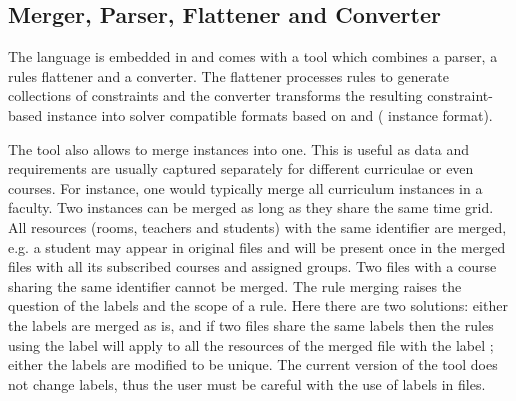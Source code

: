 
\subsection{Merger, Parser, Flattener and Converter}
The \UTP{} language is embedded in \XML{}
and comes with a \PHP{} tool 
which combines a parser, a rules flattener and a converter.
The flattener processes rules to generate collections of {\UTP} constraints
and the converter transforms the resulting constraint-based instance into 
\CP{} solver compatible formats based on \JSON{} and \DZN{} (\MINIZINC{} instance format).

The tool also allows to merge \UTP{} instances
into one.
This is useful as data and requirements are usually captured separately for different curriculae or even courses. %
For instance, one would typically merge all curriculum instances in a faculty. %
%
Two \UTP{} instances can be merged as long as they share the same time grid.
All resources (rooms, teachers and students) with the same identifier are merged, e.g. a student may appear in original files and will be present once in the merged files with all its subscribed courses and assigned groups.
Two files with a course sharing the same identifier cannot be merged.
The rule merging raises the question of the labels and the scope of a rule.
Here there are two solutions: either the labels are merged as is, and if two files share the same labels then the rules using the label will apply to all the resources of the merged file with the label ; either the labels are modified to be unique.
%
The current version of the tool does not change labels, thus the user must be careful with the use of labels in files.

